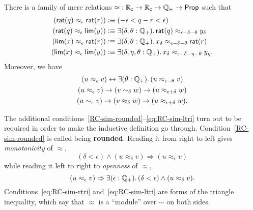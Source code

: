 
\begin{thm}\label{defn:RC-approx}
  There is a family of mere relations $\mathord\approx:\mathbb{R}_\mathsf{c}\to\mathbb{R}_\mathsf{c}\to\mathbb{Q}_{+}\to\mathsf{Prop}$ such that
  \begin{align}
    (\rcrat(q) \approx_\epsilon \rcrat(r))  &\defeq
    (-\epsilon < q - r < \epsilon)\label{eq:RCappx1}\\
    (\rcrat(q) \approx_\epsilon \rclim(y)) &\defeq
    \exis{\delta, \theta : \Qp} \rcrat(q) \approx_{\epsilon - \delta - \theta} y_\delta\label{eq:RCappx2}\\
    (\rclim(x) \approx_\epsilon \rcrat(r)) &\defeq
    \exis{\delta, \theta : \Qp} x_\delta \approx_{\epsilon - \delta - \theta} \rcrat(r)\label{eq:RCappx3}\\
    (\rclim(x) \approx_\epsilon \rclim(y)) &\defeq
    \exis{\delta, \eta, \theta : \Qp} x_\delta \approx_{\epsilon - \delta - \eta - \theta} y_\eta.\label{eq:RCappx4}
  \end{align}
  Moreover, we have
  \begin{gather}
    (u \approx_\epsilon v) \leftrightarrow \exis{\theta:\Qp} (u \approx_{\epsilon-\theta} v) \label{RC-sim-rounded}\\
    (u \approx_\epsilon v) \to (v\sim_\delta w) \to (u\approx_{\epsilon+\delta} w)\label{eq:RC-sim-rtri}\\ 
    (u \sim_\epsilon v) \to (v\approx_\delta w) \to (u\approx_{\epsilon+\delta} w)\label{eq:RC-sim-ltri}.
  \end{gather}
\end{thm}

The additional conditions~\eqref{RC-sim-rounded}--\eqref{eq:RC-sim-ltri} turn out to be required in order to make the inductive definition go through.
Condition~\eqref{RC-sim-rounded} is called being \textbf{rounded}.
Reading it from right to left gives \emph{monotonicity} of $\approx$,
%
\begin{equation*}
  (\delta < \epsilon) \land (u \approx_\delta v) \Rightarrow (u \approx_\epsilon v)
\end{equation*}
%
while reading it left to right to \emph{openness} of $\approx$,
%
\begin{equation*}
  (u \approx_\epsilon v) \Rightarrow \exis{\epsilon : \Qp} (\delta < \epsilon) \land (u \approx_\delta v).
\end{equation*}
%
Conditions~\eqref{eq:RC-sim-rtri} and~\eqref{eq:RC-sim-ltri} are forms of the triangle inequality, which say that $\approx$ is a ``module'' over $\sim$ on both sides.

